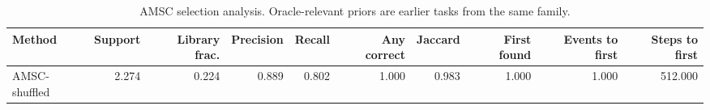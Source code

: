 \begin{table}[ht]
    \caption{AMSC selection analysis. Oracle-relevant priors are earlier tasks from the same family.}
    \label{tbl:amsc_selection}
    \centering
    \scriptsize
    \begin{tabular}{lrrrrrrrrr}
    \toprule
Method & Support & Library frac. & Precision & Recall & Any correct & Jaccard & First found & Events to first & Steps to first \\
    \midrule
AMSC-shuffled & 2.274 & 0.224 & 0.889 & 0.802 & 1.000 & 0.983 & 1.000 & 1.000 & 512.000 \\
    \bottomrule
    \end{tabular}
\end{table}

